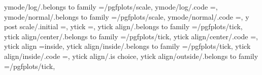 {{{{{{{{{{{ymode/log/.belongs to family                                       =/pgfplots/scale,                                                                                                                   
ymode/log/.code                                                    ={\pgfplots@yislinearfalse},                                                                                                        
ymode/normal/.belongs to family                                    =/pgfplots/scale,                                                                                                                   
ymode/normal/.code                                                 ={\pgfplots@yislineartrue},                                                                                                         
y post scale/.initial                                              =,                                                                                                                                  
ytick                                                              =,                                                                                                                                  
ytick align/.belongs to family                                     =/pgfplots/tick,                                                                                                                    
ytick align/center/.belongs to family                              =/pgfplots/tick,                                                                                                                    
ytick align/center/.code                                           ={\def\pgfplots@ytickalignnum{2}},                                                                                                  
ytick align                                                        =inside,                                                                                                                            
ytick align/inside/.belongs to family                              =/pgfplots/tick,                                                                                                                    
ytick align/inside/.code                                           ={\def\pgfplots@ytickalignnum{0}},                                                                                                  
ytick align/.is choice,
ytick align/outside/.belongs to family                             =/pgfplots/tick,                                                                                                                    
}}}}}}}}}}}
